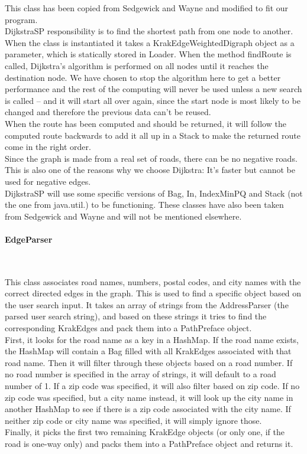 \documentclass[a4paper,10pt,titlepage]{article}
\begin{document}
This class has been copied from Sedgewick and Wayne and modified to fit our program. \\
DijkstraSP responsibility is to find the shortest path from one node to another. When the class is instantiated it takes a KrakEdgeWeightedDigraph object as a parameter, which is statically stored in Loader. When the method findRoute is called, Dijkstra’s algorithm is performed on all nodes until it reaches the destination node. We have chosen to stop the algorithm here to get a better performance and the rest of the computing will never be used unless a new search is called – and it will start all over again, since the start node is most likely to be changed and therefore the previous data can’t be reused.\\
When the route has been computed and should be returned, it will follow the computed route backwards to add it all up in a Stack to make the returned route come in the right order.\\
Since the graph is made from a real set of roads, there can be no negative roads. This is also one of the reasons why we choose Dijkstra: It’s faster but cannot be used for negative edges.\\
DijkstraSP will use some specific versions of Bag\cite{sedgewickAndWayneBag}, In\cite{sedgewickAndWayneIn}, IndexMinPQ\cite{sedgewickAndWayneIndexMinPQ} and Stack\cite{sedgewickAndWayneStack} (not the one from java.util.) to be functioning. These classes have also been taken from Sedgewick and Wayne and will not be mentioned elsewhere.\\
 
				
				\paragraph{EdgeParser}\mbox{}\
				
This class associates road names, numbers, postal codes, and city names with the correct directed edges in the graph. This is used to find a specific object based on the user search input. It takes an array of strings from the AddressParser (the parsed user search string), and based on these strings it tries to find the corresponding KrakEdges and pack them into a PathPreface object.\\
First, it looks for the road name as a key in a HashMap. If the road name exists, the HashMap will contain a Bag filled with all KrakEdges associated with that road name. Then it will filter through these objects based on a road number. If no road number is specified in the array of strings, it will default to a road number of 1. If a zip code was specified, it will also filter based on zip code. If no zip code was specified, but a city name instead, it will look up the city name in another HashMap to see if there is a zip code associated with the city name. If neither zip code or city name was specified, it will simply ignore those.\\
Finally, it picks the first two remaining KrakEdge objects (or only one, if the road is one-way only) and packs them into a PathPreface object and returns it.\\ 
				
\end{document}
